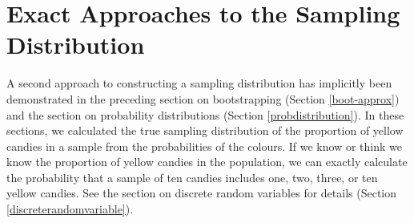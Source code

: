 \documentclass[a4paper]{book}
\newenvironment{Shaded}{\begin{snugshade}}{\end{snugshade}}
\newcommand{\DecValTok}[1]{\textcolor[rgb]{0.00,0.00,0.00}{#1}}
\newcommand{\FloatTok}[1]{\textcolor[rgb]{0.00,0.00,0.00}{#1}}
\newcommand{\StringTok}[1]{\textcolor[rgb]{0.00,0.00,0.00}{#1}}
\newcommand{\ControlFlowTok}[1]{\textcolor[rgb]{0.00,0.00,0.00}{\textbf{#1}}}
\newcommand{\OperatorTok}[1]{\textcolor[rgb]{0.00,0.00,0.00}{\textbf{#1}}}
\newcommand{\ErrorTok}[1]{\textcolor[rgb]{0.00,0.00,0.00}{\textbf{#1}}}
\newcommand{\NormalTok}[1]{#1}
\theoremstyle{definition}
\theoremstyle{definition}
\theoremstyle{definition}
\theoremstyle{remark}
\begin{document}
\begin{Shaded}
\end{Shaded}

\section{Exact Approaches to the Sampling
Distribution}\label{exact-approaches-to-the-sampling-distribution}

A second approach to constructing a sampling distribution has implicitly
been demonstrated in the preceding section on bootstrapping (Section
\ref{boot-approx}) and the section on probability distributions (Section
\ref{probdistribution}). In these sections, we calculated the true
sampling distribution of the proportion of yellow candies in a sample
from the probabilities of the colours. If we know or think we know the
proportion of yellow candies in the population, we can exactly calculate
the probability that a sample of ten candies includes one, two, three,
or ten yellow candies. See the section on discrete random variables for
details (Section \ref{discreterandomvariable}).
\end{document}
